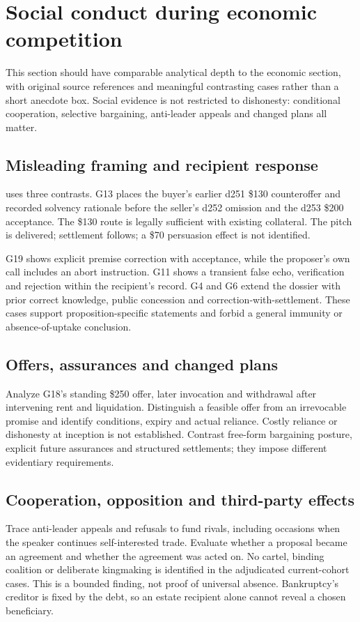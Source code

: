 \section{Social conduct during economic competition}
This section should have comparable analytical depth to the economic section, with original source references and meaningful contrasting cases rather than a short anecdote box. Social evidence is not restricted to dishonesty: conditional cooperation, selective bargaining, anti-leader appeals and changed plans all matter.

\subsection{Misleading framing and recipient response}
 uses three contrasts. G13 places the buyer's earlier d251 \$130 counteroffer and recorded solvency rationale before the seller's d252 omission and the d253 \$200 acceptance. The \$130 route is legally sufficient with existing collateral. The pitch is delivered; settlement follows; a \$70 persuasion effect is not identified.

G19 shows explicit premise correction with acceptance, while the proposer's own call includes an abort instruction. G11 shows a transient false echo, verification and rejection within the recipient's record. G4 and G6 extend the dossier with prior correct knowledge, public concession and correction-with-settlement. These cases support proposition-specific statements and forbid a general immunity or absence-of-uptake conclusion.

\subsection{Offers, assurances and changed plans}
Analyze G18's standing \$250 offer, later invocation and withdrawal after intervening rent and liquidation. Distinguish a feasible offer from an irrevocable promise and identify conditions, expiry and actual reliance. Costly reliance or dishonesty at inception is not established. Contrast free-form bargaining posture, explicit future assurances and structured settlements; they impose different evidentiary requirements.

\subsection{Cooperation, opposition and third-party effects}
Trace anti-leader appeals and refusals to fund rivals, including occasions when the speaker continues self-interested trade. Evaluate whether a proposal became an agreement and whether the agreement was acted on. No cartel, binding coalition or deliberate kingmaking is identified in the adjudicated current-cohort cases. This is a bounded finding, not proof of universal absence. Bankruptcy's creditor is fixed by the debt, so an estate recipient alone cannot reveal a chosen beneficiary.

